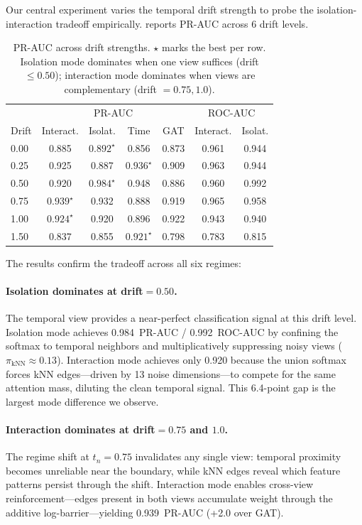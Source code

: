 \documentclass[11pt,a4paper]{article}
\begin{document}
Our central experiment varies the temporal drift strength to probe the
isolation-interaction tradeoff empirically.
 reports PR-AUC across 6 drift levels.

\begin{table}[t]
\centering
\caption{PR-AUC across drift strengths.
$\star$ marks the best per row.
Isolation mode dominates when one view suffices (drift $\le 0.50$);
interaction mode dominates when views are complementary
(drift $= 0.75, 1.0$).}
\label{tab:drift}
\begin{tabular}{@{}lcccc|cc@{}}
\toprule
 & \multicolumn{4}{c|}{PR-AUC} & \multicolumn{2}{c}{ROC-AUC} \\
Drift & Interact. & Isolat. & Time & GAT & Interact. & Isolat. \\
\midrule
0.00 & 0.885 & $\mathbf{0.892}^\star$ & 0.856 & 0.873 & 0.961 & 0.944 \\
0.25 & 0.925 & 0.887 & $\mathbf{0.936}^\star$ & 0.909 & 0.963 & 0.944 \\
0.50 & 0.920 & $\mathbf{0.984}^\star$ & 0.948 & 0.886 & 0.960 & 0.992 \\
0.75 & $\mathbf{0.939}^\star$ & 0.932 & 0.888 & 0.919 & 0.965 & 0.958 \\
1.00 & $\mathbf{0.924}^\star$ & 0.920 & 0.896 & 0.922 & 0.943 & 0.940 \\
1.50 & 0.837 & 0.855 & $\mathbf{0.921}^\star$ & 0.798 & 0.783 & 0.815 \\
\bottomrule
\end{tabular}
\end{table}

The results confirm the tradeoff across all six regimes:

\paragraph{Isolation dominates at drift${}=0.50$.}
The temporal view provides a near-perfect classification signal at this
drift level.
Isolation mode achieves 0.984~PR-AUC / 0.992~ROC-AUC by confining the
softmax to temporal neighbors and multiplicatively suppressing noisy
views ($\pi_{\text{kNN}} \approx 0.13$).
Interaction mode achieves only 0.920 because the union softmax forces
kNN edges---driven by 13 noise dimensions---to compete for the same
attention mass, diluting the clean temporal signal.
This 6.4-point gap is the largest mode difference we observe.

\paragraph{Interaction dominates at drift${}=0.75$ and $1.0$.}
The regime shift at $t_n = 0.75$ invalidates any single view: temporal
proximity becomes unreliable near the boundary, while kNN edges reveal
which feature patterns persist through the shift.
Interaction mode enables cross-view reinforcement---edges present in
both views accumulate weight through the additive log-barrier---yielding
0.939~PR-AUC (+2.0 over GAT).
\end{document}
